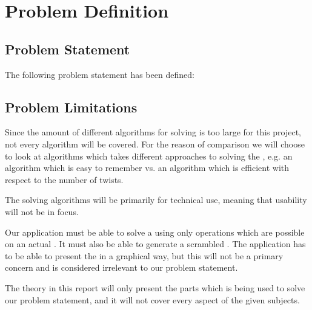 \chapter{Problem Definition}
\vspace{-6mm}
\section{Problem Statement}
The following problem statement has been defined:

\vspace{2mm}
\begin{centering}
\hspace{2mm}
\end{centering}
\section{Problem Limitations}
\label{sec:problemLimitations}
Since the amount of different algorithms for \rubik{} solving is too large for this project, not every algorithm will be covered.
For the reason of comparison we will choose to look at algorithms which takes different approaches to solving the \rubik{}, e.g. an algorithm which is easy to remember vs. an algorithm which is efficient with respect to the number of twists.

The \rubik{} solving algorithms will be primarily for technical use, meaning that usability will not be in focus.

Our application must be able to solve a \rubik{} using only operations which are possible on an actual \rubik{}.
It must also be able to generate a scrambled \rubik{}.
The application has to be able to present the \rubik{} in a graphical way, but this will not be a primary concern and is considered irrelevant to our problem statement. 

The theory in this report will only present the parts which is being used to solve our problem statement, and it will not cover every aspect of the given subjects.